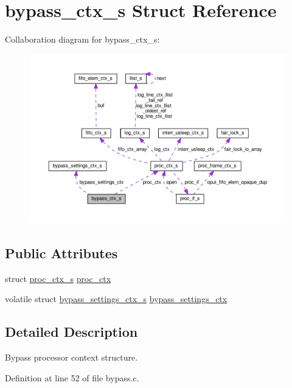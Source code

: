 \hypertarget{structbypass__ctx__s}{}\section{bypass\+\_\+ctx\+\_\+s Struct Reference}
\label{structbypass__ctx__s}


Collaboration diagram for bypass\+\_\+ctx\+\_\+s\+:\nopagebreak
\begin{figure}[H]
\begin{center}
\leavevmode
\includegraphics[width=350pt]{structbypass__ctx__s__coll__graph}
\end{center}
\end{figure}
\subsection*{Public Attributes}
\begin{DoxyCompactItemize}
\item 
struct \hyperlink{structproc__ctx__s}{proc\+\_\+ctx\+\_\+s} \hyperlink{structbypass__ctx__s_abc729b752c9d47955160e520a05177fd}{proc\+\_\+ctx}
\item 
volatile struct \hyperlink{structbypass__settings__ctx__s}{bypass\+\_\+settings\+\_\+ctx\+\_\+s} \hyperlink{structbypass__ctx__s_a490fe71a913f9bae1bab3208746d9ab4}{bypass\+\_\+settings\+\_\+ctx}
\end{DoxyCompactItemize}


\subsection{Detailed Description}
Bypass processor context structure. 

Definition at line 52 of file bypass.\+c.



